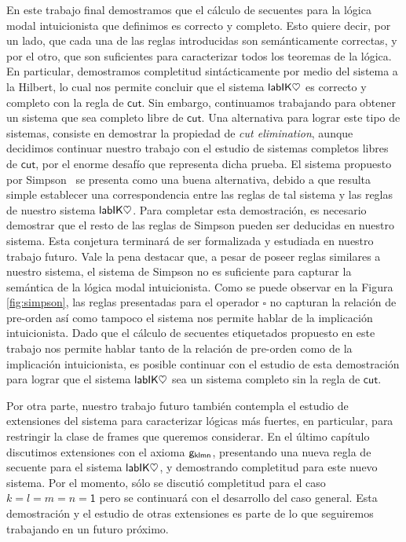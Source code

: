 En este trabajo final demostramos que el cálculo de secuentes para la lógica modal intuicionista que definimos es correcto y completo. Esto quiere decir, por un lado, que cada una de las reglas introducidas son semánticamente correctas, y por el otro, que son suficientes para caracterizar todos los teoremas de la lógica. En particular, demostramos completitud sintácticamente por medio del sistema a la Hilbert, lo cual nos permite concluir que el sistema $\mathsf{labIK\heartsuit}$ es correcto y completo con la regla de $\mathsf{cut}$. Sin embargo, continuamos trabajando para obtener un sistema que sea completo libre de $\mathsf{cut}$. Una alternativa para lograr este tipo de sistemas, consiste en demostrar la propiedad de \emph{cut elimination}, aunque decidimos continuar nuestro trabajo con el estudio de sistemas completos libres de $\mathsf{cut}$, por el enorme desafío que representa dicha prueba. El sistema propuesto por Simpson~\cite{simpson1994} se presenta como una buena alternativa, debido a que resulta simple establecer una correspondencia entre las reglas de tal sistema y las reglas de nuestro sistema $\mathsf{labIK\heartsuit}$. Para completar esta demostración, es necesario demostrar que el resto de las reglas de Simpson pueden ser deducidas en nuestro sistema. Esta conjetura terminará de ser formalizada y estudiada en nuestro trabajo futuro. Vale la pena destacar que, a pesar de poseer reglas similares a nuestro sistema, el sistema de Simpson no es suficiente para capturar la semántica de la lógica modal intuicionista. Como se puede observar en la Figura \ref{fig:simpson}, las reglas presentadas para el operador $\square$ no capturan la relación de pre-orden así como tampoco el sistema nos permite hablar de la implicación intuicionista. Dado que el cálculo de secuentes etiquetados propuesto en este trabajo nos permite hablar tanto de la relación de pre-orden como de la implicación intuicionista, es posible continuar con el estudio de esta demostración para lograr que el sistema $\mathsf{labIK\heartsuit}$ sea un sistema completo sin la regla de $\mathsf{cut}$.

Por otra parte, nuestro trabajo futuro también contempla el estudio de extensiones del sistema para caracterizar lógicas más fuertes, en particular, para restringir la clase de frames que queremos considerar. En el último capítulo discutimos extensiones con el axioma $\mathsf{g_{klmn}}$, presentando una nueva regla de secuente para el sistema $\mathsf{labIK\heartsuit}$, y demostrando completitud para este nuevo sistema. Por el momento, sólo se discutió completitud para el caso $k = l = m = n = \mathsf{1}$ pero se continuará con el desarrollo del caso general. Esta demostración y el estudio de otras extensiones es parte de lo que seguiremos trabajando en un futuro próximo.

